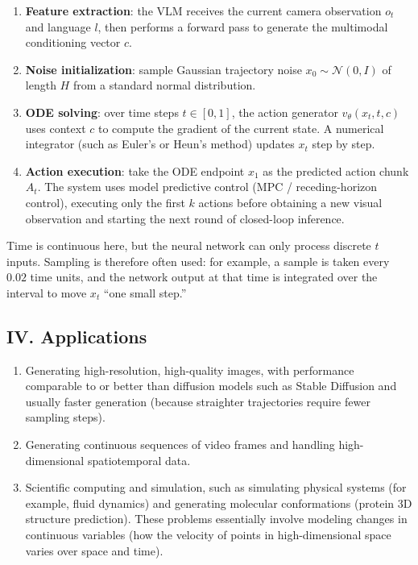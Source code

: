 \begin{enumerate}
\def\labelenumi{\arabic{enumi}.}
\tightlist
\item
  \textbf{Feature extraction}: the VLM receives the current camera observation \(o_t\) and language \(l\), then performs a forward pass to generate the multimodal conditioning vector \(c\).
\item
  \textbf{Noise initialization}: sample Gaussian trajectory noise \(x_0\sim\mathcal{N}(0,I)\) of length \(H\) from a standard normal distribution.
\item
  \textbf{ODE solving}: over time steps \(t\in[0,1]\), the action generator \(v_\theta(x_t,t,c)\) uses context \(c\) to compute the gradient of the current state. A numerical integrator (such as Euler's or Heun's method) updates \(x_t\) step by step.
\item
  \textbf{Action execution}: take the ODE endpoint \(x_1\) as the predicted action chunk \(A_t\). The system uses model predictive control (MPC / receding-horizon control), executing only the first \(k\) actions before obtaining a new visual observation and starting the next round of closed-loop inference.
\end{enumerate}

Time is continuous here, but the neural network can only process discrete \(t\) inputs. Sampling is therefore often used: for example, a sample is taken every \(0.02\) time units, and the network output at that time is integrated over the interval to move \(x_t\) ``one small step.''

\hypertarget{iv.-applications-1}{%
\subsection{IV. Applications}\label{iv.-applications-1}}

\begin{enumerate}
\def\labelenumi{\arabic{enumi}.}
\item
  Generating high-resolution, high-quality images, with performance comparable to or better than diffusion models such as Stable Diffusion and usually faster generation (because straighter trajectories require fewer sampling steps).
\item
  Generating continuous sequences of video frames and handling high-dimensional spatiotemporal data.
\item
  Scientific computing and simulation, such as simulating physical systems (for example, fluid dynamics) and generating molecular conformations (protein 3D structure prediction). These problems essentially involve modeling changes in continuous variables (how the velocity of points in high-dimensional space varies over space and time).
\end{enumerate}

